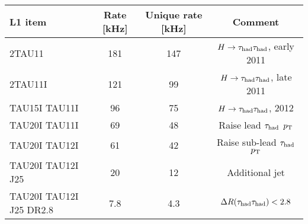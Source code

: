 \begin{tabular}{lccc}
  L1 item                 & Rate [kHz] & Unique rate [kHz] & Comment \\
  \hline
  2TAU11                  & 181        & 147               & $H\rightarrow\tau_\text{had}\tau_\text{had}$, early 2011       \\
  2TAU11I                 & 121        &  99               & $H\rightarrow\tau_\text{had}\tau_\text{had}$, late 2011        \\
  TAU15I TAU11I           &  96        &  75               & $H\rightarrow\tau_\text{had}\tau_\text{had}$, 2012             \\
  TAU20I TAU11I           &  69        &  48               & Raise lead $\tau_\text{had}$ $p_{\mathrm{T}}$     \\
  TAU20I TAU12I           &  61        &  42               & Raise sub-lead $\tau_\text{had}$ $p_{\mathrm{T}}$ \\
  TAU20I TAU12I J25       &  20        &  12               & Additional jet            \\
  TAU20I TAU12I J25 DR2.8 &   7.8      &   4.3             & $\Delta R(\tau_\text{had}\tau_\text{had}) < 2.8$          \\
\end{tabular}

